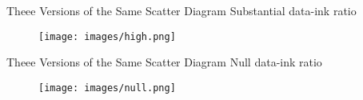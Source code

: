 \documentclass[notes, aspectratio=1610]{beamer}
\begin{document}
\begin{frame}{Theee Versions of the Same Scatter Diagram}
	{Substantial data-ink ratio}
	\begin{figure}
		\begin{center}
			\texttt{[image: images/high.png]}
		\end{center}
	\end{figure}
\end{frame}

\begin{frame}{Theee Versions of the Same Scatter Diagram}
	{Null data-ink ratio}
	\begin{figure}
		\begin{center}
			\texttt{[image: images/null.png]}
		\end{center}
	\end{figure}
\end{frame}
\end{document}

